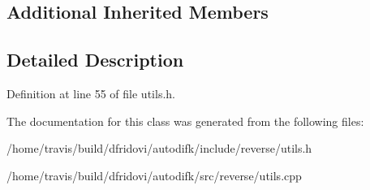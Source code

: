 \subsection*{Additional Inherited Members}


\subsection{Detailed Description}


Definition at line 55 of file utils.\-h.



The documentation for this class was generated from the following files\-:\begin{DoxyCompactItemize}
\item 
/home/travis/build/dfridovi/autodifk/include/reverse/utils.\-h\item 
/home/travis/build/dfridovi/autodifk/src/reverse/utils.\-cpp\end{DoxyCompactItemize}
